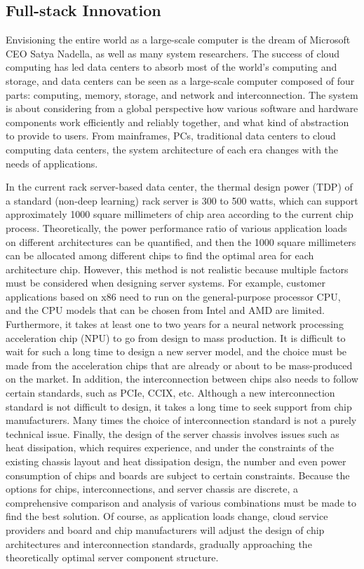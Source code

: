 \subsection{Full-stack Innovation}

Envisioning the entire world as a large-scale computer is the dream of Microsoft CEO Satya Nadella, as well as many system researchers. The success of cloud computing has led data centers to absorb most of the world's computing and storage, and data centers can be seen as a large-scale computer composed of four parts: computing, memory, storage, and network and interconnection. The system is about considering from a global perspective how various software and hardware components work efficiently and reliably together, and what kind of abstraction to provide to users. From mainframes, PCs, traditional data centers to cloud computing data centers, the system architecture of each era changes with the needs of applications.

In the current rack server-based data center, the thermal design power (TDP) of a standard (non-deep learning) rack server is 300 to 500 watts, which can support approximately 1000 square millimeters of chip area according to the current chip process. Theoretically, the power performance ratio of various application loads on different architectures can be quantified, and then the 1000 square millimeters can be allocated among different chips to find the optimal area for each architecture chip. However, this method is not realistic because multiple factors must be considered when designing server systems. For example, customer applications based on x86 need to run on the general-purpose processor CPU, and the CPU models that can be chosen from Intel and AMD are limited. Furthermore, it takes at least one to two years for a neural network processing acceleration chip (NPU) to go from design to mass production. It is difficult to wait for such a long time to design a new server model, and the choice must be made from the acceleration chips that are already or about to be mass-produced on the market. In addition, the interconnection between chips also needs to follow certain standards, such as PCIe, CCIX, etc. Although a new interconnection standard is not difficult to design, it takes a long time to seek support from chip manufacturers. Many times the choice of interconnection standard is not a purely technical issue. Finally, the design of the server chassis involves issues such as heat dissipation, which requires experience, and under the constraints of the existing chassis layout and heat dissipation design, the number and even power consumption of chips and boards are subject to certain constraints. Because the options for chips, interconnections, and server chassis are discrete, a comprehensive comparison and analysis of various combinations must be made to find the best solution. Of course, as application loads change, cloud service providers and board and chip manufacturers will adjust the design of chip architectures and interconnection standards, gradually approaching the theoretically optimal server component structure.

